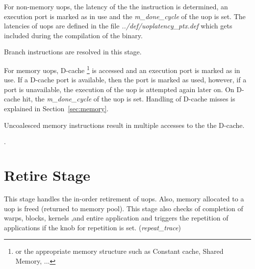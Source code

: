 \begin{itemize}

\item For non-memory uops, the latency of the the instruction is determined, an
	  execution port is marked as in use and the \textit{m\_done\_cycle} of the uop
	  is set. The latencies of uops are defined in the file
	  \textit{../def/uoplatency\_ptx.def} which gets included during the compilation
	  of the \SIM binary. 
	  
\item Branch instructions are resolved in this stage.

\item For memory uops, D-cache \footnote{or the appropriate memory structure such as
    Constant cache, Shared Memory, ...} is accessed and an execution port is
	marked as in use. If a D-cache port is available, then the port is marked as
	used, however, if a port is unavailable, the execution of the uop is attempted
	again later on. On D-cache hit, the \textit{m\_done\_cycle} of the uop is set.
	Handling of D-cache misses is explained in Section~\ref{sec:memory}.

\item Uncoalesced memory instructions result in multiple accesses to the the D-cache.

\ignore
		{ \item {}.  }

\end{itemize}

\section{Retire Stage}

This stage handles the in-order retirement of uops. Also, memory allocated to a uop
is freed (returned to memory pool). This stage also checks of completion of
warps, blocks, kernels ,and entire application and triggers the
repetition of applications if the knob for repetition is set. (\textit{repeat\_trace})

\ignore
		{
		}

